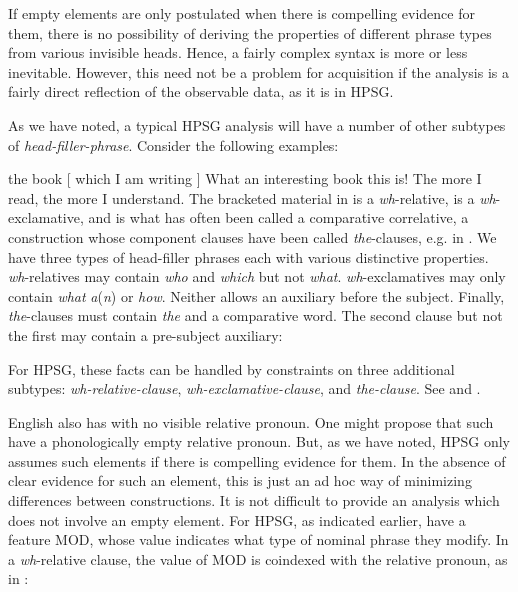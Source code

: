 \documentclass[output=paper]{langsci/langscibook}
\begin{document}
If empty elements are only postulated when there is compelling evidence for
them, there is no possibility of deriving the properties of different phrase
types from various invisible heads. Hence, a fairly complex syntax is more or
less inevitable. However, this need not be a problem for acquisition if the
analysis is a fairly direct reflection of the observable data, as it is in
\gls{HPSG}.

As we have noted, a typical \gls{HPSG} analysis will have a number of other
subtypes of \emph{head-filler-phrase}. Consider the following examples:

\ea\label{ex:key:4.9}
    the book [ which I am writing ]
\z
\ea\label{ex:key:4.10}
    What an interesting book this is!
\z
\ea\label{ex:key:4.11}
    The more I read, the more I understand.
\z
%
The bracketed material in  is a \emph{wh}-relative,
 is a \emph{wh}-exclamative, and  is what has
often been called a comparative correlative, a construction whose component
clauses have been called \emph{the}{}-clauses, e.g. in \citet{Borsley2011}. We
have three types of head-filler phrases each with various distinctive
properties. \emph{wh}-relatives may contain \emph{who} and \emph{which} but not
\emph{what}. \emph{wh}-exclamatives may only contain \emph{what}
\emph{a}(\emph{n}) or \emph{how}. Neither allows an auxiliary before the
subject. Finally, \emph{the}{}-clauses must contain \emph{the} and a
comparative word. The second clause but not the first may contain a pre-subject
auxiliary:

\ea\label{ex:key:4.12}
    \z
\z
%
For \gls{HPSG}, these facts can be handled by constraints on three additional
subtypes: \emph{wh-relative-clause}, \emph{wh-exclamative-clause}, and
\emph{the-clause}. See \citet{GinSag2000} and \citet{Sag2010}.

English also has  with no visible relative pronoun. One might
propose that such  have a phonologically empty relative
pronoun. But, as we have noted, \gls{HPSG} only assumes such elements if there
is compelling evidence for them. In the absence of clear evidence for such an
element, this is just an ad hoc way of minimizing differences between
constructions. It is not difficult to provide an analysis which does not involve
an empty element. For \gls{HPSG}, as
indicated earlier,  have a feature MOD, whose value
indicates what type of nominal phrase they modify. In a \emph{wh}-relative
clause, the value of MOD is coindexed with the relative pronoun, as in
:
\end{document}
